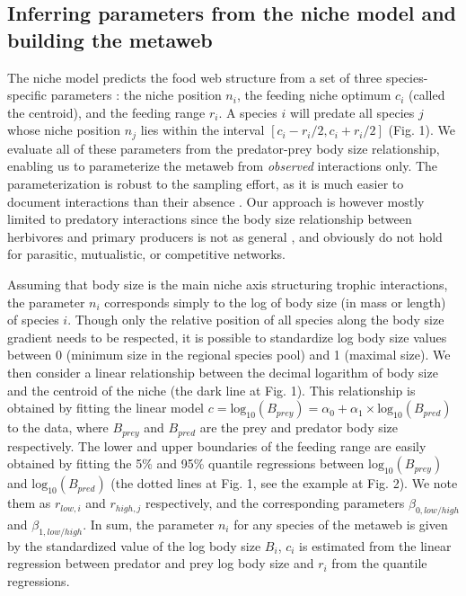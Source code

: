 \documentclass[12pt]{article}
\begin{document}
\subsection{Inferring parameters from the niche model and building the metaweb}

The niche model predicts the food web structure from a set of three
species-specific parameters \parencite{Williams2000}: the niche position $n_i$, the feeding niche optimum
$c_i$ (called the centroid), and the feeding range $r_i$. A species $i$ will
predate all species $j$ whose niche position $n_j$ lies within the interval
$[c_i-r_i/2,c_i+r_i/2]$ (Fig. 1). We evaluate all of these parameters from the
predator-prey body size relationship, enabling us to parameterize the metaweb
from \emph{observed} interactions only. The parameterization is robust to the
sampling effort, as it is much easier to document interactions than their
absence \parencite{Martinez1999}. Our approach is however mostly limited to
predatory interactions since the body size relationship between herbivores and
primary producers is not as general \parencite{Riede2010}, and obviously do not
hold for parasitic, mutualistic, or competitive networks. 

Assuming that body size is the main niche axis structuring trophic interactions,
the parameter $n_i$ corresponds simply to the log of body size (in mass or
length) of species $i$. Though only the relative position of all species along
the body size gradient needs to be respected, it is possible to standardize log
body size values between 0 (minimum size in the regional species pool) and 1
(maximal size). We then consider a linear relationship between the decimal
logarithm of body size and the centroid of the niche (the dark line at Fig. 1).
This relationship is obtained by fitting the linear model $c =
\mathrm{log}_{10}(B_{prey})=\alpha_0 +
\alpha_1\times\mathrm{log}_{10}(B_{pred})$ to the data, where $B_{prey}$ and
$B_{pred}$ are the prey and predator body size respectively. The lower and upper
boundaries of the feeding range are easily obtained by fitting the 5\% and 95\%
quantile regressions between $\mathrm{log}_{10}(B_{prey})$ and
$\mathrm{log}_{10}(B_{pred})$ (the dotted lines at Fig. 1, see the example at Fig.
2). We note them as $r_{low,i}$ and $r_{high,j}$ respectively, and the
corresponding parameters $\beta_{0,low/high}$ and $\beta_{1,low/high}$.  In sum,
the parameter $n_i$ for any species of the metaweb is given by the standardized
value of the log body size $B_i$, $c_i$ is estimated from the linear regression
between predator and prey log body size and $r_i$ from the quantile regressions. 
\end{document}
